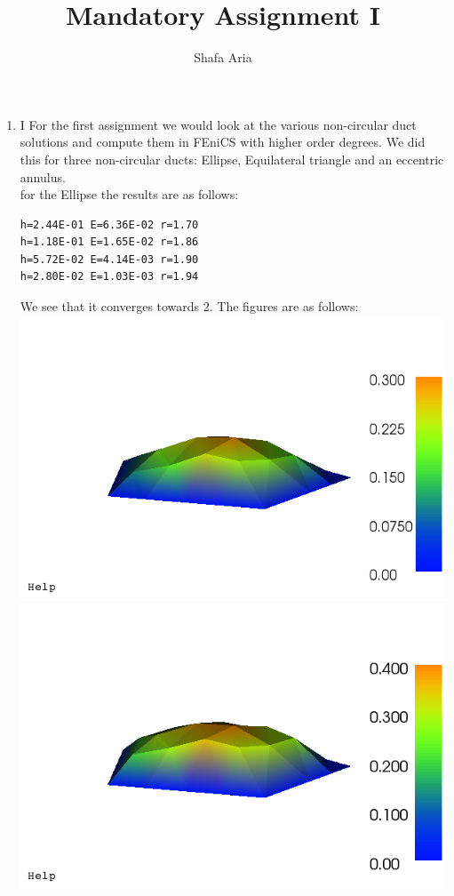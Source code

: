 \documentclass{article}
\begin{document}
\title{Mandatory Assignment I}
\author{Shafa Aria}
\maketitle
\begin{enumerate}
\item{I}
For the first assignment we would look at the various non-circular duct solutions and compute them in FEniCS with higher order degrees. We did this for three non-circular ducts: Ellipse, Equilateral triangle and an eccentric annulus.\\

for the Ellipse the results are as follows:
\begin{verbatim}
h=2.44E-01 E=6.36E-02 r=1.70
h=1.18E-01 E=1.65E-02 r=1.86
h=5.72E-02 E=4.14E-03 r=1.90
h=2.80E-02 E=1.03E-03 r=1.94
\end{verbatim}
We see that it converges towards 2. The figures are as follows:\\
\hspace{-4cm}\includegraphics[scale=0.3]{dolfin_plot_0.png}
\includegraphics[scale=0.3]{dolfin_plot_1.png}\\

\end{enumerate}
\end{document}
